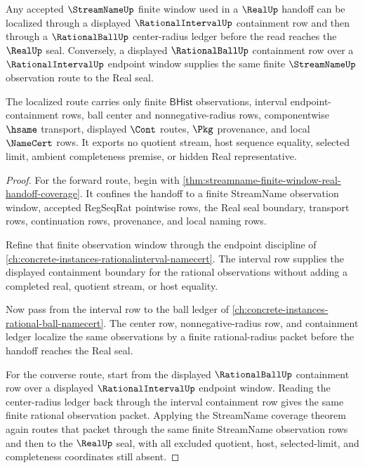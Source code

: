 \begin{theorem}
\label{thm:streamname-rational-ball-window-localization}
Any accepted $\StreamNameUp$ finite window used in a $\RealUp$ handoff can be localized through a displayed $\RationalIntervalUp$ containment row and then through a $\RationalBallUp$ center-radius ledger before the read reaches the $\RealUp$ seal. Conversely, a displayed $\RationalBallUp$ containment row over a $\RationalIntervalUp$ endpoint window supplies the same finite $\StreamNameUp$ observation route to the Real seal.

The localized route carries only finite $\mathsf{BHist}$ observations, interval endpoint-containment rows, ball center and nonnegative-radius rows, componentwise $\hsame$ transport, displayed $\Cont$ routes, $\Pkg$ provenance, and local $\NameCert$ rows. It exports no quotient stream, host sequence equality, selected limit, ambient completeness premise, or hidden Real representative.
\end{theorem}
\begin{proof}
For the forward route, begin with \autoref{thm:streamname-finite-window-real-handoff-coverage}. It confines the handoff to a finite StreamName observation window, accepted RegSeqRat pointwise rows, the Real seal boundary, transport rows, continuation rows, provenance, and local naming rows.

Refine that finite observation window through the endpoint discipline of \autoref{ch:concrete-instances-rationalinterval-namecert}. The interval row supplies the displayed containment boundary for the rational observations without adding a completed real, quotient stream, or host equality.

Now pass from the interval row to the ball ledger of \autoref{ch:concrete-instances-rational-ball-namecert}. The center row, nonnegative-radius row, and containment ledger localize the same observations by a finite rational-radius packet before the handoff reaches the Real seal.

For the converse route, start from the displayed $\RationalBallUp$ containment row over a displayed $\RationalIntervalUp$ endpoint window. Reading the center-radius ledger back through the interval containment row gives the same finite rational observation packet. Applying the StreamName coverage theorem again routes that packet through the same finite StreamName observation rows and then to the $\RealUp$ seal, with all excluded quotient, host, selected-limit, and completeness coordinates still absent.
\end{proof}

